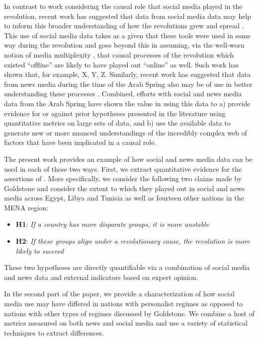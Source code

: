 In contrast to work considering the causal role that social media played in the revolution, recent work has suggested that data from social media data may help to inform this broader understanding of how the revolutions grew and spread \citep{}.  This use of social media data takes as a given that these tools were used in some way during the revolution and goes beyond this in assuming, via the well-worn notion of media multiplexity \citep{}, that causal processes of the revolution which existed ``offline'' are likely to have played out ``online'' as well.  Such work has shown that, for example, X, Y, Z. Similarly, recent work has suggested that data from news media during the time of the Arab Spring also may be of use in better understanding these processes \citep{joseph_arab_2014,pfeffer_rapid_2012}. Combined, efforts with social and news media data from the Arab Spring have shown the value in using this data to a) provide evidence for or against prior hypotheses presented in the literature using quantitative metrics on large sets of data, and b) use the available data to generate new or more nuanced understandings of the incredibly complex web of factors that have been implicated in a causal role.

The present work provides an example of how social and news media data can be used in each of these two ways. First, we extract quantitative evidence for the assertions of . More specifically, we consider the following two claims made by Goldstone and consider the extent to which they played out in social and news media across Egypt, Libya and Tunisia as well as fourteen other nations in the MENA region:
\begin{itemize}
	\item {\bf H1}: \emph{If a country has more disparate groups, it is more unstable}
	\item {\bf H2}: \emph{If these groups align under a revolutionary cause, the revolution is more likely to succeed}
\end{itemize}

These two hypotheses are directly quantifiable via a combination of social media and news data and external indicators based on expert opinion.  

In the second part of the paper, we provide a characterization of how social media use may have differed in nations with personalist regimes as opposed to nations with other types of regimes discussed by Goldstone. We combine a host of metrics measured on both news and social media and use a variety of statistical techniques to extract differences.  


